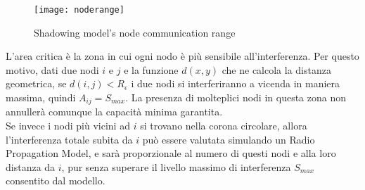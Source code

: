 \begin{wrapfigure}{r}{0.5\textwidth}
	\begin{center}
		\texttt{[image: noderange]}
	\end{center}
	\caption{Shadowing model's node communication range\label{fig:noderange}}
\end{wrapfigure}

L'area critica è la zona in cui ogni nodo è più sensibile all'interferenza. Per questo motivo, dati due nodi $i$ e $j$ e la funzione $d(x,y)$ che ne calcola la distanza geometrica, se $d(i,j) < R_\epsilon $ i due nodi si interferiranno a vicenda in maniera massima, quindi $A_{ij} = S_{max}$.
La presenza di molteplici nodi in questa zona non annullerà comunque la capacità minima garantita. \\
Se invece i nodi più vicini ad $i$ si trovano nella corona circolare, allora l'interferenza totale subita da $i$ può essere valutata simulando un Radio Propagation Model, e sarà proporzionale al numero di questi nodi e alla loro distanza da $i$, pur senza superare il livello massimo di interferenza $S_{max}$ consentito dal modello. 


